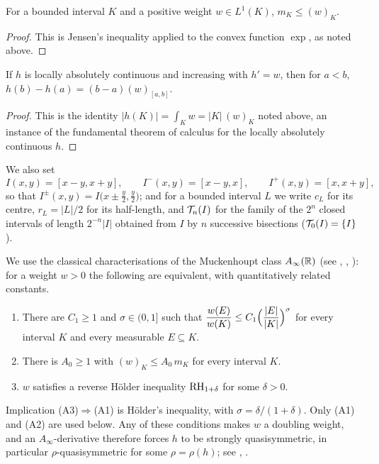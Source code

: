 \begin{lemma}\label{lem:geomMean_le_mean}
	\leanok
	For a bounded interval $K$ and a positive weight $w\in L^1(K)$, $m_K\le(w)_K$.
\end{lemma}
\begin{proof}
	This is Jensen's inequality applied to the convex function $\exp$, as noted above.
\end{proof}

\begin{lemma}\label{lem:imageLength_eq_mean}
	\leanok
	If $h$ is locally absolutely continuous and increasing with $h'=w$, then for $a<b$,
	$h(b)-h(a)=(b-a)(w)_{[a,b]}$.
\end{lemma}
\begin{proof}
	This is the identity $|h(K)|=\int_Kw=|K|\,(w)_K$ noted above, an instance of the
	fundamental theorem of calculus for the locally absolutely continuous $h$.
\end{proof}

We also set
\[
I(x,y)=[x-y,x+y],\qquad I^-(x,y)=[x-y,x],\qquad I^+(x,y)=[x,x+y],
\]
so that $I^{\pm}(x,y)=I\bigl(x\pm\tfrac y2,\tfrac y2\bigr)$; and for a bounded
interval $L$ we write $c_L$ for its centre, $r_L=|L|/2$ for its half-length,
and $\mathcal{T}_n(I)$ for the family of the $2^n$ closed intervals of length
$2^{-n}|I|$ obtained from $I$ by $n$ successive bisections
($\mathcal{T}_0(I)=\{I\}$).

We use the classical characterisations of the Muckenhoupt class $A_\infty(\mathbb{R})$
(see \cite[Ch.~VI]{Gar}, \cite{CF}, \cite[Ch.~IV]{GR}): for a weight $w>0$ the
following are equivalent, with quantitatively related constants.
\begin{enumerate}
	\item[(A1)] There are $C_1\ge1$ and $\sigma\in(0,1]$ such that
	$\dfrac{w(E)}{w(K)}\le C_1\Bigl(\dfrac{|E|}{|K|}\Bigr)^{\sigma}$
	for every interval $K$ and every measurable $E\subseteq K$.
	\item[(A2)] There is $A_0\ge1$ with $(w)_K\le A_0\,m_K$ for every interval $K$.
	\item[(A3)] $w$ satisfies a reverse H\"older inequality $\mathrm{RH}_{1+\delta}$ for
	some $\delta>0$.
\end{enumerate}
Implication (A3)$\Rightarrow$(A1) is H\"older's inequality, with
$\sigma=\delta/(1+\delta)$. Only (A1) and (A2) are used below. Any of these
conditions makes $w$ a doubling weight, and an $A_\infty$-derivative therefore
forces $h$ to be strongly quasisymmetric, in particular $\rho$-quasisymmetric
for some $\rho=\rho(h)$; see \cite{Jon}, \cite{HS}.


